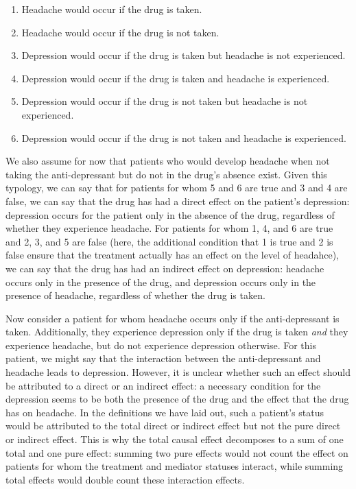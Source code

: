 \begin{enumerate}[noitemsep,topsep=0pt]
\item Headache would occur if the drug is taken.
\item Headache would occur if the drug is not taken.
\item Depression would occur if the drug is taken but headache is not experienced.
\item Depression would occur if the drug is taken and headache is experienced.
\item Depression would occur if the drug is not taken but headache is not experienced.
\item Depression would occur if the drug is not taken and headache is experienced.
\end{enumerate}

We also assume for now that patients who would develop headache when not taking the anti-depressant but do not in the 
drug's absence exist. Given this typology, we can say that for patients for whom 5 and 6 are true and 3 and 4 are
false, we can say that the drug has had a direct effect on the patient's depression: depression occurs for the 
patient only in the absence of the drug, regardless of whether they experience headache. 
For patients for whom 1, 4, and 6 are true and 2, 3, and 5 are false (here, the additional condition that 1 is 
true and 2 is false ensure that the treatment actually has an effect on the level of headahce), we can say
that the drug has had an indirect effect on depression: headache occurs only in the presence of the drug,
and depression occurs only in the presence of headache, regardless of whether the drug is taken. 

Now consider a patient for whom headache occurs only if the anti-depressant is taken. Additionally, they 
experience depression only if the drug is taken \textit{and} they experience headache, but do not experience
depression otherwise. For this patient, we might say that the interaction between the anti-depressant and 
headache leads to depression. However, it is unclear whether such an effect should be attributed to a direct or
an indirect effect: a necessary condition for the depression seems to be both the presence of the drug and 
the effect that the drug has on headache. In the definitions we have laid out, such a patient's status would be
attributed to the total direct or indirect effect but not the pure direct or indirect effect. This is why the
total causal effect decomposes to a sum of one total and one pure effect: summing two pure effects would not
count the effect on patients for whom the treatment and mediator statuses interact, while summing total effects 
would double count these interaction effects. 


